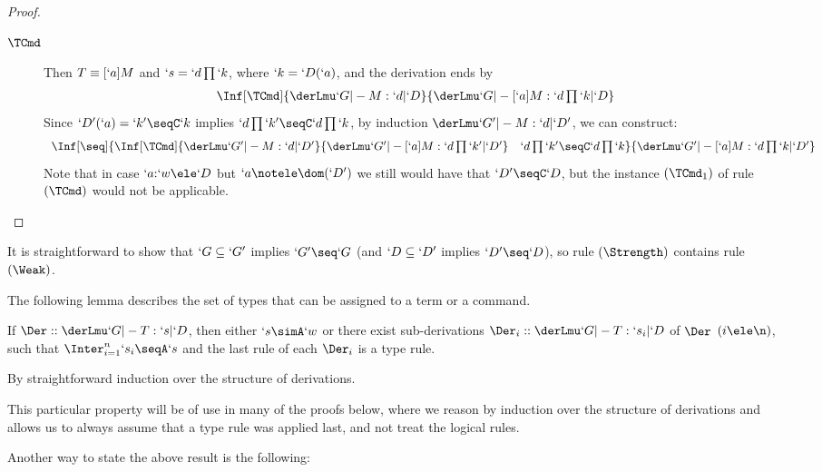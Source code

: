 \documentclass{CSML}
\begin{document}
\begin{proof}
{\begin{description}
 \item [$ \TCmd $] 
Then $T\equiv [`a]M$ and $`s = `d\prod `k$, where $`k=`D(`a)$, and the derivation ends by
%
 \[ \begin{array}{c}
\Inf	[\TCmd]
	{\InfBox{ \derLmu `G |- M : `d | `D }
	}{ \derLmu `G |- [`a]M : `d\prod `k | `D }
 \end{array} \]
Since $`D'(`a)=`k'\seqC`k$ implies $`d\prod `k' \seqC `d\prod `k$, by induction $ \derLmu `G' |- M : `d | `D' $, we can construct:
%
 \[ \begin{array}{c}
\Inf	[\seq]
	{\Inf	[\TCmd]
{\InfBox{ \derLmu `G' |- M : `d | `D' }
}{ \derLmu `G' |- [`a]M : `d\prod `k' | `D' } 
	 \quad
	 \InfBox{`d\prod `k' \seqC `d\prod `k}
	}{ \derLmu `G' |- [`a]M : `d\prod `k | `D' }
 \end{array} \]
Note that in case $`a{:}`w\ele `D $ but $`a\notele \dom(`D')$ we still would have
that $`D'\seqC `D $, but the instance $(\TCmd_1)$ of rule $(\TCmd)$ would not be applicable.
 \qedhere

 \end{description}
} %
 \end{proof}

\noindent It is straightforward to show that $`G \subseteq `G'$ implies $`G' \seq `G$ (and $`D \subseteq `D'$ implies $`D' \seq `D$), so rule $(\Strength)$ contains rule $(\Weak)$.

The following lemma describes the set of types that can be assigned to a term or a command. 

 \begin{lem} \label{lem:logicalRules}
If $\Der :: \derLmu `G |- T : `s | `D $, then either $`s \simA `w$ or there exist sub-derivations $\Der_i :: \derLmu `G |- T : `s_i | `D $ of $\Der$ $(i \ele \n)$, such that $\Inter_{i=1}^n`s_i \seqA `s$ and the last rule of each $\Der_i$ is a type rule.
 \end{lem}

 \begin{Proof}
By straightforward induction over the structure of derivations. 
 \end{Proof}

This particular property will be of use in many of the proofs below, where we reason by induction over the structure of derivations and allows us to always assume that a type rule was applied last, and not treat the logical rules.

Another way to state the above result is the following:
\newpage
\end{document}
